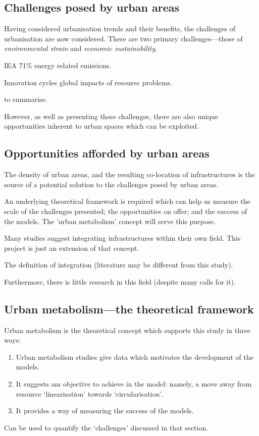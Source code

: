 \subsection{Challenges posed by urban areas}
Having considered urbanisation trends and their benefits, the challenges of urbanisation are now considered. There are two primary challenges---those of \emph{environmental strain} and \emph{economic sustainability}.

IEA 71\% energy related emissions.

\citep{Bettencourt2007} Innovation cycles
\citep{Agudelo-Vera2011} global impacts of resourec problems.

\citep{Batt2010} to summarise.



However, as well as presenting these challenges, there are also unique opportunities inherent to urban spaces which can be exploited.

\subsection{Opportunities afforded by urban areas}
The density of urban areas, and the resulting co-location of infrastructures is the source of a potential solution to the challenges posed by urban areas.

An underlying theoretical framework is required which can help us measure the scale of the challenges presented; the opportunities on offer; and the success of the models. The 'urban metabolism' concept will serve this purpose.

Many studies suggest integrating infrastructures within their own field. This project is just an extension of that concept.

The definition of integration (literature may be different from this study).

Furthermore, there is little research in this field (despite many calls for it).  

\subsection{Urban metabolism---the theoretical framework}
Urban metabolism is the theoretical concept which supports this study in three ways:
\begin{enumerate}
	\item Urban metabolism studies give data which motivates the development of the models.
	\item It suggests am objective to achieve in the model: namely, a move away from resource `linearisation' towards `circularisation'.
	\item It provides a way of measuring the success of the models.
\end{enumerate}
Can be used to quantify the `challenges' discussed in that section.

